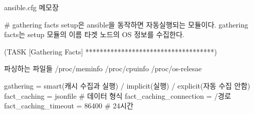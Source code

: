 
ansible.cfg 메모장


# gathering facts
setup은 ansible을 동작하면 자동실행되는 모듈이다.
gathering facts는 setup 모듈의 이름
타겟 노드의 OS 정보를 수집한다.

(TASK [Gathering Facts] ************************************)

파싱하는 파일들
/proc/meminfo
/proc/cpuinfo
/proc/os-relesae


gathering = smart(캐시 수집과 실행) / implicit(실행) / explicit(자동 수집 안함)
fact_caching = jsonfile # 데이터 형식
fact_caching_connection = /경로
fact_caching_timeout = 86400 # 24시간


